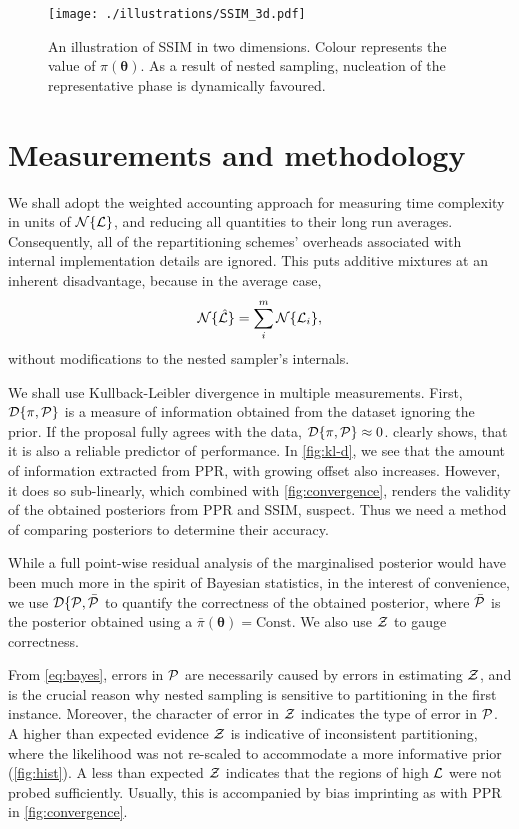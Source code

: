 \documentclass[usenatbib]{mnras}
\begin{document}
\begin{figure}
  \centering
  \texttt{[image: ./illustrations/SSIM\_3d.pdf]}
  \caption{An illustration of SSIM in two dimensions. Colour represents the value of $\pi(\bm{\theta})$. As a result of nested sampling, nucleation of the representative phase is dynamically favoured.}
  \label{fig:mixture-3d}
\end{figure}


\section{Measurements and methodology}
We shall adopt the weighted accounting approach \citep{Cormen} for
measuring time complexity in units of \({\cal N}\{{\cal L}\}\), and
reducing all quantities to their long run averages. Consequently, all
of the repartitioning schemes' overheads associated with internal
implementation details are ignored. This puts additive mixtures at an
inherent disadvantage, because in the average case,
\begin{equation}
  \label{eq:additive-t-complexity}
  {\cal N}\{ \hat{\cal L}\} = \sum_{i}^{m} {\cal N}\{{\cal L}_{i}\}, 
\end{equation}
without modifications to the nested sampler's internals.


We shall use Kullback-Leibler divergence in multiple
measurements. First, ${\cal D}\{\pi, {\cal P}\}$ is a measure of
information obtained from the dataset ignoring the prior. If the
proposal fully agrees with the data,
${\cal D}\{ \pi, {\cal P} \} \approx 0$.  
clearly shows, that it is also a reliable predictor of performance. In
\cref{fig:kl-d}, we see that the amount of information extracted from
PPR, with growing offset also increases. However, it does so
sub-linearly, which combined with \cref{fig:convergence}, renders the
validity of the obtained posteriors from PPR and SSIM, suspect. Thus
we need a method of comparing posteriors to determine their accuracy.

While a full point-wise residual analysis of the marginalised
posterior would have been much more in the spirit of Bayesian
statistics, in the interest of convenience, we use
${\cal D}\{ {\cal P}, \bar{\cal P}$ to quantify the correctness of the
obtained posterior, where $\bar{\cal P}$ is the posterior obtained
using a $\bar{\pi}(\bm{\theta}) = \text{Const}$. We also use
${\cal Z}$ to gauge correctness.

From \cref{eq:bayes}, errors in ${\cal P}$ are necessarily caused by
errors in estimating ${\cal Z}$, and is the crucial reason why nested
sampling is sensitive to partitioning in the first instance. Moreover,
the character of error in ${\cal Z}$ indicates the type of error in
${\cal P}$. A higher than expected evidence ${\cal Z}$ is indicative
of inconsistent partitioning, where the likelihood was not re-scaled
to accommodate a more informative prior (\cref{fig:hist}). A less than
expected ${\cal Z}$ indicates that the regions of high ${\cal L}$ were
not probed sufficiently. Usually, this is accompanied by bias
imprinting as with PPR in \cref{fig:convergence}.
\end{document}
